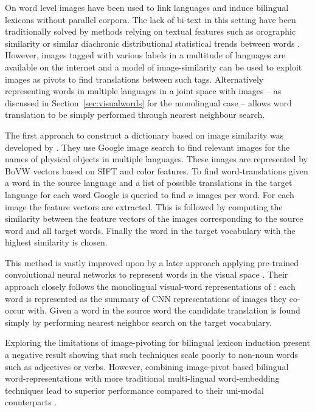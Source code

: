On word level images have been used to link languages and induce bilingual
lexicons without parallel corpora. The lack of bi-text in this setting have
been traditionally solved by methods relying on textual features
such as orographic similarity \citep{haghighi2008learning} or similar diachronic distributional
statistical trends between words \citep{schafer2002inducing}.
However, images tagged with various labels in a multitude of languages are
available on the internet and a model of image-similarity can be used to exploit
images as pivots to find translations between such tags. Alternatively representing words in multiple
languages in a joint space with images 
-- as discussed in Section~\ref{sec:visualwords} for the monolingual case --
allows word translation to be simply performed through nearest neighbour search.

The first approach to construct a dictionary based on image similarity was
developed by \cite{bergsma2011learning}. They use Google image search to find
relevant images for the names of physical objects in multiple languages.
These images are represented by BoVW vectors based
on SIFT and color features. To find word-translations given a word in the
source language and a list of possible translations in the target language
for each word Google is queried to find $n$ images per word. For each image the
feature vectors are extracted. This is followed by computing the similarity
between the feature vectors of the images corresponding to the source word and
all target words. Finally the word in the target vocabulary with the highest
similarity is chosen.

This method is vastly improved upon by a later approach applying
pre-trained convolutional neural networks to represent words
in the visual space \citep{kiela2015visual}. Their approach closely follows
the monolingual visual-word representations of \cite{kiela2014improving}:
each word is represented as the summary of CNN representations of images they
co-occur with. Given a word in the source word the candidate translation is found
simply by performing nearest neighbor search on the target vocabulary.

Exploring the limitations of image-pivoting for bilingual lexicon induction
\cite{hartmann2017limitations} present a negative result
showing that such techniques scale poorly to non-noun words such as
adjectives or verbs. However, combining image-pivot based bilingual
word-representations with more traditional multi-lingual word-embedding
techniques lead to superior performance compared to their uni-modal
counterparts \cite{vulic2016multi}. 

